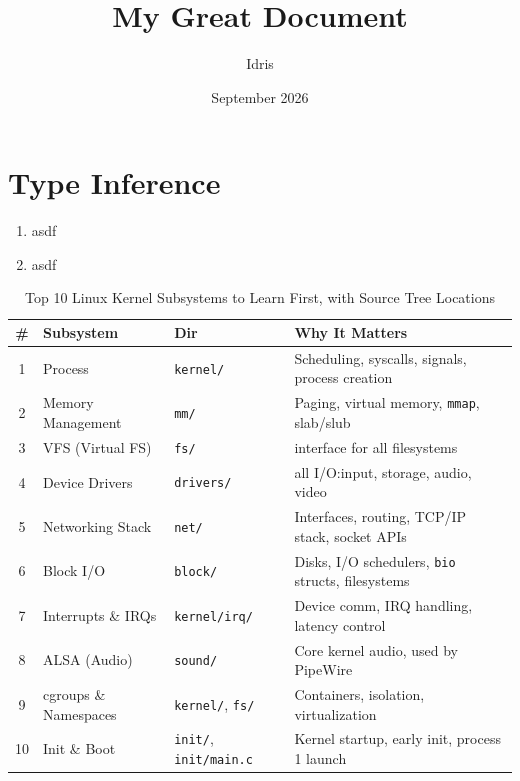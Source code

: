 \documentclass[openany, 12pt]{book}
\title{My Great Document}
\author{Idris}
\date{September 2026}
\begin{document}
\maketitle{}
\tableofcontents

\listoffigures
\listoftables

\chapter{Type Inference}

\begin{enumerate}[label = {(\alph*)}]
  \item asdf
  \item asdf
\end{enumerate}

\begin{table}[h]
  \centering
  \begin{tabular}{clll}
    \toprule
    \textbf{\#} & \textbf{Subsystem}    & \textbf{Dir}                         & \textbf{Why It Matters}                                  \\
    \midrule
    1           & Process               & \texttt{kernel/}                     & Scheduling, syscalls, signals, process creation          \\
    2           & Memory Management     & \texttt{mm/}                         & Paging, virtual memory, \texttt{mmap}, slab/slub         \\
    3           & VFS (Virtual FS)      & \texttt{fs/}                         & interface for all filesystems                            \\
    4           & Device Drivers        & \texttt{drivers/}                    & all I/O:\@ input, storage, audio, video                  \\
    5           & Networking Stack      & \texttt{net/}                        & Interfaces, routing, TCP/IP stack, socket APIs           \\
    6           & Block I/O             & \texttt{block/}                      & Disks, I/O schedulers, \texttt{bio} structs, filesystems \\
    7           & Interrupts \& IRQs    & \texttt{kernel/irq/}                 & Device comm, IRQ handling, latency control               \\
    8           & ALSA (Audio)          & \texttt{sound/}                      & Core kernel audio, used by PipeWire                      \\
    9           & cgroups \& Namespaces & \texttt{kernel/}, \texttt{fs/}       & Containers, isolation, virtualization                    \\
    10          & Init \& Boot          & \texttt{init/}, \texttt{init/main.c} & Kernel startup, early init, process 1 launch             \\
    \bottomrule
  \end{tabular}
  \caption{Top 10 Linux Kernel Subsystems to Learn First, with Source Tree Locations}
\end{table}
\end{document}
